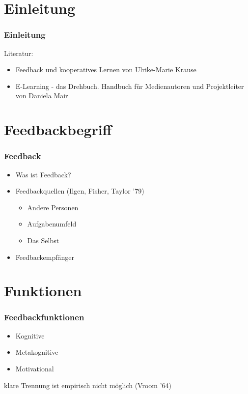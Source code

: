 
%
%

\section{Einleitung}

\begin{frame}
	\frametitle{Einleitung}

	Literatur:
	\begin{itemize}
		\item Feedback und kooperatives Lernen von Ulrike-Marie Krause
		\item E-Learning - das Drehbuch. Handbuch für Medienautoren und Projektleiter von Daniela Mair
	\end{itemize}
\end{frame}

\section{Feedbackbegriff}

\begin{frame}
	\frametitle{Feedback}
	\begin{itemize}
		\item Was ist Feedback?
		\item<2-> Feedbackquellen \small(Ilgen, Fisher, Taylor '79)
		\begin{itemize}
		    \item Andere Personen
			\item Aufgabenumfeld
			\item Das Selbst
		\end{itemize}
		\item<3-> Feedbackempfänger
	\end{itemize}
\end{frame}


\section{Funktionen}

\begin{frame}[<+->]
	\frametitle{Feedbackfunktionen}
	\begin{itemize}
		\item Kognitive
		\item Metakognitive
		\item Motivational
	\end{itemize}


	klare Trennung ist empirisch nicht möglich \small(Vroom '64)
\end{frame}

